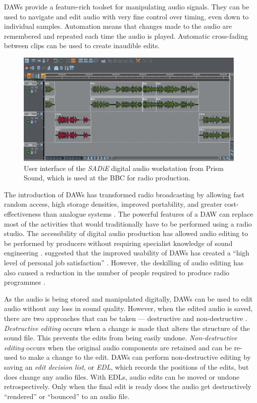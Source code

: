DAWs provide a feature-rich toolset for manipulating audio signals.  They can be used to navigate and edit audio with
very fine control over timing, even down to individual samples. Automation means that changes made to the audio are
remembered and repeated each time the audio is played. Automatic cross-fading between clips can be used to
create inaudible edits.

\begin{figure}[t]
\centering
  \centering
  \includegraphics[width=\textwidth]{figs/sadie-example.png}
  \caption{User interface of the \textit{SADiE} digital audio workstation from Prism Sound, which is used at the BBC
  for radio production.} 
  \label{fig:sadie-example}
\end{figure}

The introduction of DAWs has transformed radio broadcasting by allowing fast random access, high storage densities,
improved portability, and greater cost-effectiveness than analogue systems \citep{Pizzi1989}.  The powerful features of
a DAW can replace most of the activities that would traditionally have to be performed using a radio studio.  The
accessibility of digital audio production has allowed audio editing to be performed by producers without requiring
specialist knowledge of sound engineering \citep{Peus2011}.  \citet[p.~44]{McLeish2015} suggested that the improved
usability of DAWs has created a ``high level of personal job satisfaction'' \citep[p.~44]{McLeish2015}.  However, the
deskilling of audio editing has also caused a reduction in the number of people required to produce radio programmes
\citep{Dunaway2000}.


As the audio is being stored and manipulated digitally, DAWs can be used to edit audio without any loss in sound
quality. However, when the edited audio is saved, there are two approaches that can be taken --- destructive and
non-destructive \citep[p.~45]{McLeish2015}. \textit{Destructive editing} occurs when a change is made that alters the
structure of the sound file.  This prevents the edits from being easily undone. \textit{Non-destructive editing}
occurs when the original audio components are retained and can be re-used to make a change to the edit. DAWs can
perform non-destructive editing by saving an \textit{edit decision list}, or \textit{EDL}, which records the positions
of the edits, but does change any audio files. With EDLs, audio edits can be moved or undone retrospectively. Only when
the final edit is ready does the audio get destructively ``rendered'' or ``bounced'' to an audio file.

